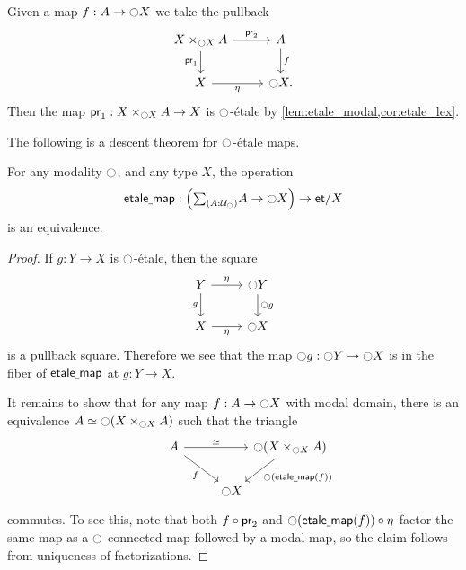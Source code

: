 \documentclass[9pt,twosided]{amsart}
\newcommand{\et}{\mathsf{et}}
\begin{document}
\begin{constr}
Given a map $f:A\to {\ensuremath{\ocircle}} X$ we take the pullback
\begin{equation*}
\begin{tikzcd}
X\times_{\modal X}A \arrow[d,swap,"\proj 1"] \arrow[r,"\proj 2"] & A \arrow[d,"f"] \\
X \arrow[r,swap,"\modalunit"] & \modal X.
\end{tikzcd}
\end{equation*}
Then the map $\mathsf{pr}_{1}:X\times_{{\ocircle} X}A\to X$ is ${\ocircle}$-\'etale by \cref{lem:etale_modal,cor:etale_lex}.
\end{constr}

The following is a descent theorem for ${\ocircle}$-\'etale maps.

\begin{thm}\label{thm:modal_descent}
For any modality ${\ocircle}$, and any type $X$, the operation
\begin{equation*}
\etmap:\Big(\sm{A:\UU_\modal}A\to\modal X\Big)\to\et/X
\end{equation*}
is an equivalence.
\end{thm}

\begin{proof}
If $g:Y\to X$ is ${\ocircle}$-\'etale, then the square
\begin{equation*}
\begin{tikzcd}
Y \arrow[d,swap,"g"] \arrow[r,"\modalunit"] & \modal Y \arrow[d,"\modal g"] \\
X \arrow[r,swap,"\modalunit"] & \modal X
\end{tikzcd}
\end{equation*}
is a pullback square. Therefore we see that the map ${\ocircle} g : {\ocircle} Y \to {\ensuremath{\ocircle}} X$ is in the fiber of $\mathsf{etale\underline{\ }{}map}$ at $g : Y\to X$. 

It remains to show that for any map $f:A\to{\ensuremath{\ocircle}} X$ with modal domain, there is an equivalence $\eqv{A}{\modal (X\times_{\modal X} A)}$ such that the triangle
\begin{equation*}
\begin{tikzcd}[column sep=0]
A \arrow[dr,swap,"f"] \arrow[rr,"\eqvsym"] & & \modal (X\times_{\modal X} A) \arrow[dl,"\modal(\etmap(f))"] \\
\phantom{\modal (X\times_{\modal X} A)} & \modal X
\end{tikzcd}
\end{equation*}
commutes. To see this, note that both $f\circ \mathsf{pr}_{2}$ and ${\ocircle}(\mathsf{etale\underline{\ }{}map}(f))\circ {\eta_{}}$ factor the same map as a ${\ocircle}$-connected map followed by a modal map, so the claim follows from uniqueness of factorizations.
\end{proof}
\end{document}
